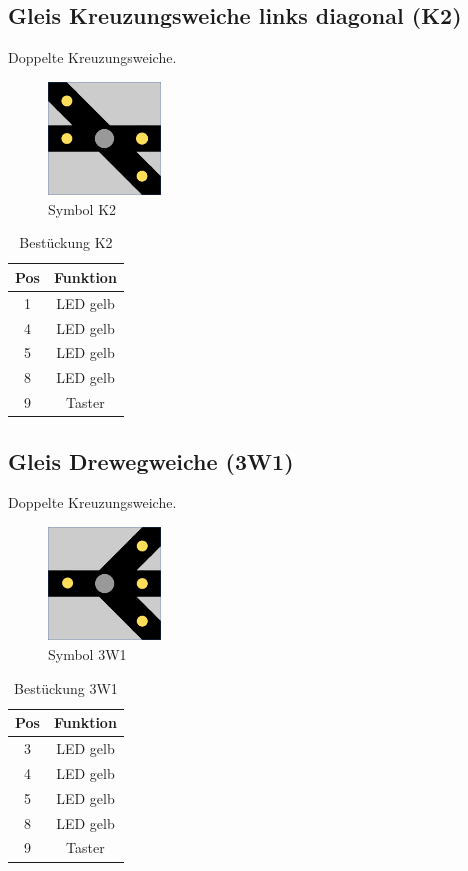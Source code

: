 \documentclass[10pt,a4paper]{article}
\begin{document}
\subsection{Gleis Kreuzungsweiche links diagonal (K2)}
Doppelte Kreuzungsweiche.
\begin{figure}[hbtp]
\centering
\includegraphics[width=3cm]{../folien/k2.png}
\caption{Symbol K2}
\end{figure}
\begin{table}[h!]
\centering
\begin{tabular}{c|c}
\textbf{Pos} & \textbf{Funktion} \\ \hline
1 & LED gelb \\
4 & LED gelb \\
5 & LED gelb \\
8 & LED gelb \\
9 & Taster
\end{tabular}
\caption{Bestückung K2}
\end{table}


\subsection{Gleis Drewegweiche (3W1)}
Doppelte Kreuzungsweiche.
\begin{figure}[hbtp]
\centering
\includegraphics[width=3cm]{../folien/3w1.png}
\caption{Symbol 3W1}
\end{figure}
\begin{table}[h!]
\centering
\begin{tabular}{c|c}
\textbf{Pos} & \textbf{Funktion} \\ \hline
3 & LED gelb \\
4 & LED gelb \\
5 & LED gelb \\
8 & LED gelb \\
9 & Taster
\end{tabular}
\caption{Bestückung 3W1}
\end{table}
\end{document}
